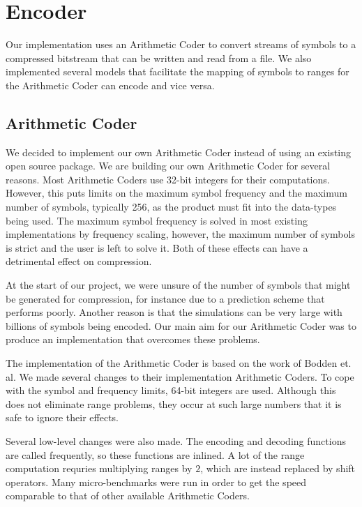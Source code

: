 \documentclass[a4paper,11pt]{report}
\begin{document}
\section{Encoder}

Our implementation uses an Arithmetic Coder to convert streams of symbols to a compressed bitstream that can be written and read from a file. We also implemented several models that facilitate the mapping of symbols to ranges for the Arithmetic Coder can encode and vice versa.

\subsection{Arithmetic Coder}

We decided to implement our own Arithmetic Coder instead of using an existing open source package. We are building our own Arithmetic Coder for several reasons. Most Arithmetic Coders use 32-bit integers for their computations. However, this puts limits on the maximum symbol frequency and the maximum number of symbols, typically 256, as the product must fit into the data-types being used\cite{RefWorks:4}. The maximum symbol frequency is solved in most existing implementations by frequency scaling, however, the maximum number of symbols is strict and the user is left to solve it. Both of these effects can have a detrimental effect on compression. 

At the start of our project, we were unsure of the number of symbols that might be generated for compression, for instance due to a prediction scheme that performs poorly. Another reason is that the simulations can be very large with billions of symbols being encoded. Our main aim for our Arithmetic Coder was to produce an implementation that overcomes these problems.

The implementation of the Arithmetic Coder is based on the work of Bodden et. al\cite{bodden2001arithmetic}. We made several changes to their implementation Arithmetic Coders. To cope with the symbol and frequency limits, 64-bit integers are used. Although this does not eliminate range problems, they occur at such large numbers that it is safe to ignore their effects.

Several low-level changes were also made. The encoding and decoding functions are called frequently, so these functions are inlined. A lot of the range computation requries multiplying ranges by $2$, which are instead replaced by shift operators. Many micro-benchmarks were run in order to get the speed comparable to that of other available Arithmetic Coders.
\end{document}
